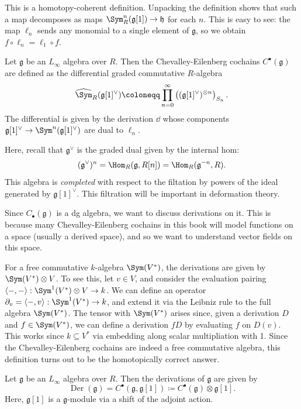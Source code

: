 This is a homotopy-coherent definition. Unpacking the definition shows that such a map decomposes as maps $\Sym ^n_R(\mathfrak{g} [1]) \to \mathfrak{h} $ for each $n$. This is easy to see: the map $\ell _n$ sends any monomial to a single element of $\mathfrak{g} $, so we obtain $f\circ \ell _n = \ell _1 \circ f$.

\begin{definition}\label{dfn:10-1-4}
	Let $\mathfrak{g} $ be an $L_\infty $ algebra over $R$. Then the Chevalley-Eilenberg cochains $C^{\bullet} (\mathfrak{g} )$ are defined as the differential graded commutative $R$-algebra
	\[
		\widehat{\Sym }_R(\mathfrak{g} [1]^\vee )\coloneqq \prod_{n=0}^{\infty } \left( (\mathfrak{g}[1]^{\vee } )^{\otimes n}  \right)_{S_n} 
	.\]
	The differential is given by the derivation $\dd $ whose components $\mathfrak{g} [1]^{\vee } \to \Sym ^n(\mathfrak{g} [1]^{\vee } )$ are dual to $\ell _n$.
\end{definition}

Here, recall that $\mathfrak{g} ^{\vee } $ is the graded dual given by the internal hom:
\[
	(\mathfrak{g} ^{\vee } )^n = \Hom_{R}(\mathfrak{g}, R[n]) = \Hom_{R}(\mathfrak{g} ^{-n} , R) 
.\]
This algebra is \emph{completed} with respect to the filtation by powers of the ideal generated by $\mathfrak{g} [1]^{\vee } $. This filtration will be important in deformation theory.


Since $C_{\bullet} (\mathfrak{g} )$ is a dg algebra, we want to discuss derivations on it. This is because many Chevalley-Eilenberg cochains in this book will model functions on a space (usually a derived space), and so we want to understand vector fields on this space.

For a free commutative $k$-algebra $\Sym (V^*)$, the derivations are given by $\Sym (V^*)\otimes V$. To see this, let $v\in V$, and consider the evaluation pairing $\left\langle -,- \right\rangle : \Sym ^1(V^*)\otimes V \to k$. We can define an operator $\partial _v =\left\langle -,v \right\rangle : \Sym ^1(V^*) \to k$, and extend it via the Leibniz rule to the full algebra $\Sym (V^*)$. The tensor with $\Sym (V^*)$ arises since, given a derivation $D$ and $f\in \Sym (V^*)$, we can define a derivation $fD$ by evaluating $f$ on $D(v)$. This works since $k\subseteq V^*$ via embedding along scalar multipliation with 1. Since the Chevalley-Eilenberg cochains are indeed a free commutative algebra, this definition turns out to be the homotopically correct answer.

\begin{definition}\label{dfn:10-1-5}
	Let $\mathfrak{g} $ be an $L_\infty $ algebra over $R$. Then the derivations of $\mathfrak{g} $ are given by
	\[
		\operatorname{Der} (\mathfrak{g} )=C^{\bullet} (\mathfrak{g} ,\mathfrak{g} [1]) \coloneqq C^{\bullet} (\mathfrak{g} )\otimes \mathfrak{g} [1]
	.\]
	Here, $\mathfrak{g} [1]$ is a $\mathfrak{g} $-module via a shift of the adjoint action.
\end{definition}

